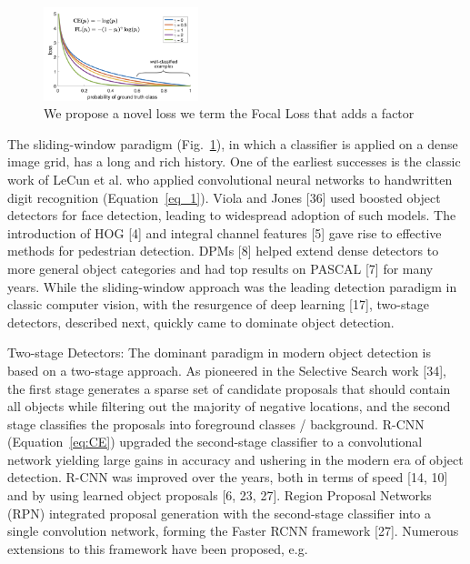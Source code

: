 \begin{figure}
\includegraphics[width=0.4\textwidth]{Illustrations/loss.png}%
\caption{We propose a novel loss we term the Focal Loss that adds a factor}
\label{fig:my_label}
\end{figure}

The sliding-window paradigm (Fig.~\ref{fig:my_label}),
in which a classifier is applied on a dense image grid, has
a long and rich history. One of the earliest successes is the
classic work of LeCun et al. who applied convolutional neural networks to handwritten digit recognition (Equation~\ref{eq_1}). Viola and Jones [36] used boosted object detectors for face
detection, leading to widespread adoption of such models.
The introduction of HOG [4] and integral channel features
[5] gave rise to effective methods for pedestrian detection.
DPMs [8] helped extend dense detectors to more general
object categories and had top results on PASCAL [7] for
many years. While the sliding-window approach was the
leading detection paradigm in classic computer vision, with
the resurgence of deep learning [17], two-stage detectors,
described next, quickly came to dominate object detection.


Two-stage Detectors: The dominant paradigm in modern
object detection is based on a two-stage approach. As pioneered in the Selective Search work [34], the first stage generates a sparse set of candidate proposals that should contain all objects while filtering out the majority of negative
locations, and the second stage classifies the proposals into
foreground classes / background. R-CNN (Equation~\ref{eq:CE}) upgraded the
second-stage classifier to a convolutional network yielding
large gains in accuracy and ushering in the modern era of
object detection. R-CNN was improved over the years, both
in terms of speed [14, 10] and by using learned object proposals [6, 23, 27]. Region Proposal Networks (RPN) integrated proposal generation with the second-stage classifier
into a single convolution network, forming the Faster RCNN framework [27]. Numerous extensions to this framework have been proposed, e.g.




